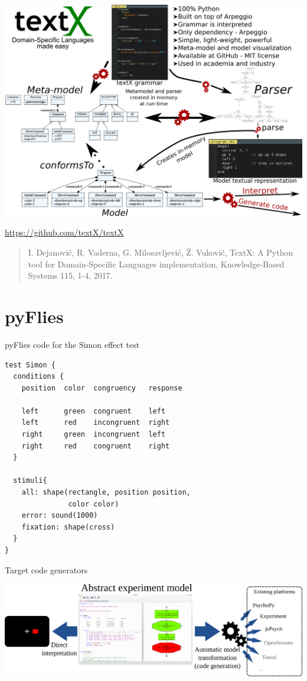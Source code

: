 \documentclass[presentation]{beamer}
\begin{document}
\begin{frame}[label={sec:org101c989}]{}
\vfill
\begin{center}
\includegraphics[width=.9\linewidth]{./images/textX.png}
\end{center} 
\begin{center}
\fontsize{9pt}\selectfont
\url{https://github.com/textX/textX}
\end{center}
\fontsize{6pt}\selectfont
\begin{quote}
I. Dejanović, R. Vaderna, G. Milosavljević, Ž. Vuković, TextX: A Python tool for
Domain-Specific Languages implementation, Knowledge-Based Systems 115,
1-4, 2017.
\end{quote}
\end{frame}
\section*{pyFlies}
\label{sec:org0e86e33}
\begin{frame}[label={sec:org881de09},fragile]{pyFlies code for the Simon effect test}
 \begin{verbatim}
test Simon {
  conditions {
    position  color  congruency   response

    left      green  congruent    left
    left      red    incongruent  right
    right     green  incongruent  left
    right     red    congruent    right
  }

  stimuli{
    all: shape(rectangle, position position,
               color color)
    error: sound(1000)
    fixation: shape(cross)
  }
}
\end{verbatim}
\end{frame}

\begin{frame}[label={sec:orgf20c55c}]{Target code generators}
\begin{center}
\includegraphics[width=1\textwidth]{./images/architecture.png}
\end{center} 
\end{frame}
\end{document}
